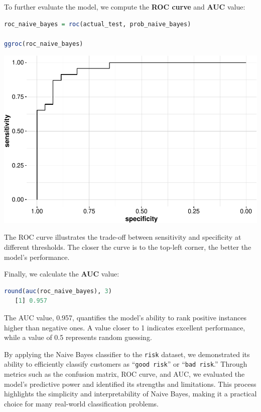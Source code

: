 \documentclass[
]{book}
\newcommand{\passthrough}[1]{#1}
\theoremstyle{definition}
\theoremstyle{definition}
\theoremstyle{definition}
\theoremstyle{definition}
\theoremstyle{remark}
\begin{document}
To further evaluate the model, we compute the \textbf{ROC curve} and \textbf{AUC} value:

\begin{lstlisting}[language=R]
roc_naive_bayes = roc(actual_test, prob_naive_bayes)

ggroc(roc_naive_bayes)
\end{lstlisting}

\begin{center}\includegraphics{bayes_files/figure-latex/unnamed-chunk-17-1} \end{center}

The ROC curve illustrates the trade-off between sensitivity and specificity at different thresholds. The closer the curve is to the top-left corner, the better the model's performance.

Finally, we calculate the \textbf{AUC} value:

\begin{lstlisting}[language=R]
round(auc(roc_naive_bayes), 3)
   [1] 0.957
\end{lstlisting}

The AUC value, 0.957, quantifies the model's ability to rank positive instances higher than negative ones. A value closer to 1 indicates excellent performance, while a value of 0.5 represents random guessing.

By applying the Naive Bayes classifier to the \passthrough{\lstinline!risk!} dataset, we demonstrated its ability to efficiently classify customers as ``\passthrough{\lstinline!good risk!}'' or ``\passthrough{\lstinline!bad risk!}.'' Through metrics such as the confusion matrix, ROC curve, and AUC, we evaluated the model's predictive power and identified its strengths and limitations. This process highlights the simplicity and interpretability of Naive Bayes, making it a practical choice for many real-world classification problems.
\end{document}
